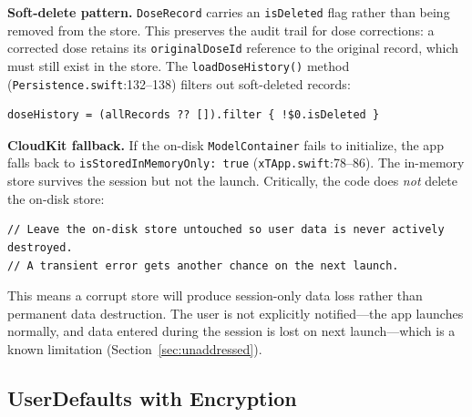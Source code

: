 \documentclass[11pt,a4paper]{article}
\newcommand{\code}[1]{\texttt{\small #1}}
\begin{document}
\textbf{Soft-delete pattern.} \code{DoseRecord} carries an \code{isDeleted}
flag rather than being removed from the store. This preserves the audit trail
for dose corrections: a corrected dose retains its \code{originalDoseId}
reference to the original record, which must still exist in the store. The
\code{loadDoseHistory()} method (\code{Persistence.swift}:132--138) filters
out soft-deleted records:
\begin{verbatim}
doseHistory = (allRecords ?? []).filter { !$0.isDeleted }
\end{verbatim}

\textbf{CloudKit fallback.} If the on-disk \code{ModelContainer} fails to
initialize, the app falls back to \code{isStoredInMemoryOnly: true}
(\code{xTApp.swift}:78--86). The in-memory store survives the session but
not the launch. Critically, the code does \emph{not} delete the on-disk
store:
\begin{verbatim}
// Leave the on-disk store untouched so user data is never actively destroyed.
// A transient error gets another chance on the next launch.
\end{verbatim}
This means a corrupt store will produce session-only data loss rather than
permanent data destruction. The user is not explicitly notified---the app
launches normally, and data entered during the session is lost on next
launch---which is a known limitation (Section~\ref{sec:unaddressed}).

\subsection{UserDefaults with Encryption}
\label{sec:userdefaults}
\end{document}
